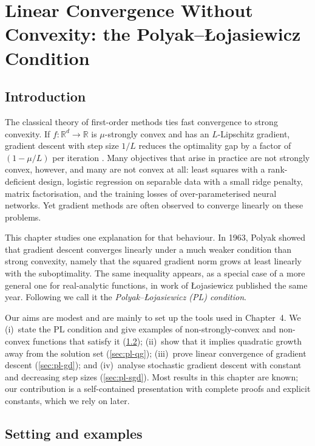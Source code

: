 \documentclass[11pt,a4paper,oneside]{report}
\theoremstyle{plain}
\theoremstyle{definition}
\theoremstyle{remark}
\newcommand{\R}{\mathbb{R}}
\begin{document}
\setcounter{chapter}{2}

\chapter{Linear Convergence Without Convexity: the Polyak--{\L}ojasiewicz Condition}
\label{ch:pl}

\section{Introduction}
\label{sec:pl-intro}

The classical theory of first-order methods ties fast convergence to strong convexity. If $f\colon\R^d\to\R$ is $\mu$-strongly convex and has an $L$-Lipschitz gradient, gradient descent with step size $1/L$ reduces the optimality gap by a factor of $(1 - \mu/L)$ per iteration \citep{nesterov2004}. Many objectives that arise in practice are not strongly convex, however, and many are not convex at all: least squares with a rank-deficient design, logistic regression on separable data with a small ridge penalty, matrix factorisation, and the training losses of over-parameterised neural networks. Yet gradient methods are often observed to converge linearly on these problems.

This chapter studies one explanation for that behaviour. In 1963, Polyak \citep{polyak1963} showed that gradient descent converges linearly under a much weaker condition than strong convexity, namely that the squared gradient norm grows at least linearly with the suboptimality. The same inequality appears, as a special case of a more general one for real-analytic functions, in work of {\L}ojasiewicz \citep{lojasiewicz1963} published the same year. Following \citet{karimi2016} we call it the \emph{Polyak--{\L}ojasiewicz (PL) condition}.

Our aims are modest and are mainly to set up the tools used in Chapter~4. We (i)~state the PL condition and give examples of non-strongly-convex and non-convex functions that satisfy it (\cref{sec:pl-setting}); (ii)~show that it implies quadratic growth away from the solution set (\cref{sec:pl-qg}); (iii)~prove linear convergence of gradient descent (\cref{sec:pl-gd}); and (iv)~analyse stochastic gradient descent with constant and decreasing step sizes (\cref{sec:pl-sgd}). Most results in this chapter are known; our contribution is a self-contained presentation with complete proofs and explicit constants, which we rely on later.

\section{Setting and examples}
\label{sec:pl-setting}
\end{document}
